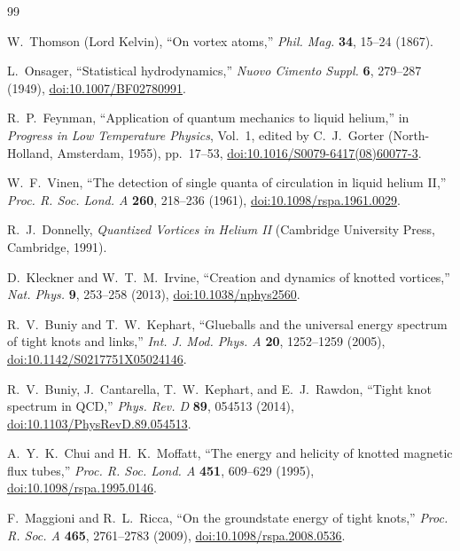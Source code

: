\documentclass[aps,pre,preprint,notitlepage,nofootinbib,superscriptaddress]{revtex4-2}
\begin{document}
\begin{thebibliography}{99}

W.~Thomson (Lord Kelvin),
``On vortex atoms,''
\emph{Phil. Mag.} \textbf{34}, 15--24 (1867).

L.~Onsager,
``Statistical hydrodynamics,''
\emph{Nuovo Cimento Suppl.} \textbf{6}, 279--287 (1949),
\href{https://doi.org/10.1007/BF02780991}{doi:10.1007/BF02780991}.

R.~P.~Feynman,
``Application of quantum mechanics to liquid helium,''
in \emph{Progress in Low Temperature Physics}, Vol.~1, edited by C.~J.~Gorter
(North-Holland, Amsterdam, 1955), pp.~17--53,
\href{https://doi.org/10.1016/S0079-6417(08)60077-3}{doi:10.1016/S0079-6417(08)60077-3}.

W.~F.~Vinen,
``The detection of single quanta of circulation in liquid helium II,''
\emph{Proc. R. Soc. Lond. A} \textbf{260}, 218--236 (1961),
\href{https://doi.org/10.1098/rspa.1961.0029}{doi:10.1098/rspa.1961.0029}.

R.~J.~Donnelly,
\emph{Quantized Vortices in Helium II}
(Cambridge University Press, Cambridge, 1991).

D.~Kleckner and W.~T.~M.~Irvine,
``Creation and dynamics of knotted vortices,''
\emph{Nat. Phys.} \textbf{9}, 253--258 (2013),
\href{https://doi.org/10.1038/nphys2560}{doi:10.1038/nphys2560}.

R.~V.~Buniy and T.~W.~Kephart,
``Glueballs and the universal energy spectrum of tight knots and links,''
\emph{Int. J. Mod. Phys. A} \textbf{20}, 1252--1259 (2005),
\href{https://doi.org/10.1142/S0217751X05024146}{doi:10.1142/S0217751X05024146}.

R.~V.~Buniy, J.~Cantarella, T.~W.~Kephart, and E.~J.~Rawdon,
``Tight knot spectrum in QCD,''
\emph{Phys. Rev. D} \textbf{89}, 054513 (2014),
\href{https://doi.org/10.1103/PhysRevD.89.054513}{doi:10.1103/PhysRevD.89.054513}.

A.~Y.~K.~Chui and H.~K.~Moffatt,
``The energy and helicity of knotted magnetic flux tubes,''
\emph{Proc. R. Soc. Lond. A} \textbf{451}, 609--629 (1995),
\href{https://doi.org/10.1098/rspa.1995.0146}{doi:10.1098/rspa.1995.0146}.

F.~Maggioni and R.~L.~Ricca,
``On the groundstate energy of tight knots,''
\emph{Proc. R. Soc. A} \textbf{465}, 2761--2783 (2009),
\href{https://doi.org/10.1098/rspa.2008.0536}{doi:10.1098/rspa.2008.0536}.


\end{thebibliography}
\end{document}

